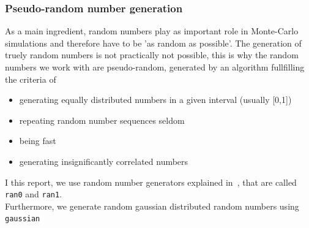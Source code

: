 \subsubsection{Pseudo-random number generation}\label{sec:ran}
As a main ingredient, random numbers play as important role in Monte-Carlo simulations and therefore have to be 'as random as possible'. The generation of truely random numbers is not practically not possible, this is why the random numbers we work with are pseudo-random, generated by an algorithm fullfilling the criteria of
\begin{itemize}
\item generating equally distributed numbers in a given interval (usually [0,1])
\item repeating random number sequences seldom
\item being fast
\item generating insignificantly correlated numbers
\end{itemize}
I this report, we use random number generators explained in~\cite{numerical}, that are called \texttt{ran0} and \texttt{ran1}.\\
Furthermore, we generate random gaussian distributed random numbers using \texttt{gaussian} %
